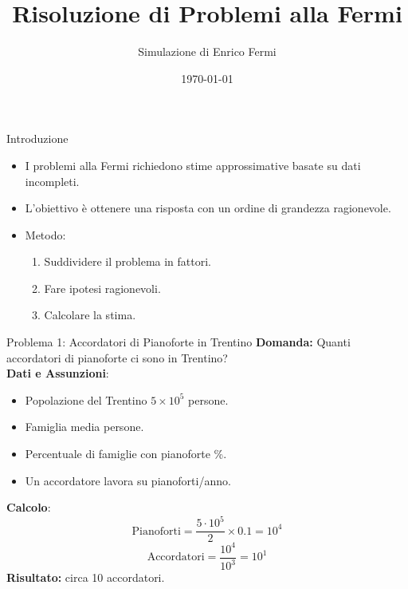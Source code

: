 \documentclass{beamer}
\title{Risoluzione di Problemi alla Fermi}
\author{Simulazione di Enrico Fermi}
\date{\today}
\begin{document}
\begin{frame}
    \titlepage
\end{frame}

\begin{frame}{Introduzione}
    \begin{itemize}
        \item I problemi alla Fermi richiedono stime approssimative basate su dati incompleti. \pause
        \item L'obiettivo è ottenere una risposta con un ordine di grandezza ragionevole. \pause
        \item Metodo: \pause
        \begin{enumerate}
            \item Suddividere il problema in fattori. \pause
            \item Fare ipotesi ragionevoli. \pause
            \item Calcolare la stima.
        \end{enumerate}
    \end{itemize}
\end{frame}

\begin{frame}{Problema 1: Accordatori di Pianoforte in Trentino}
    \textbf{Domanda:} Quanti accordatori di pianoforte ci sono in Trentino? \\
    \vspace{1em}
    \textbf{Dati e Assunzioni}: \pause
    \begin{itemize}
        \item Popolazione del Trentino \pause
        $5 \times 10^5$ persone. \pause
        \item Famiglia media   persone. \pause
        \item Percentuale di famiglie con pianoforte  \%. \pause
        \item Un accordatore lavora su  pianoforti/anno. \pause
    \end{itemize}
    \pause
    \textbf{Calcolo}:
    \[
    \text{Pianoforti} = \frac{5 \cdot 10^5}{2} \times 0.1 = 10^4
    \]
    \pause
    \[
    \text{Accordatori} = \frac{10^4}{10^3} = 10^1
    \]
    \pause
    \textbf{Risultato:} circa 10 accordatori.
\end{frame}
\end{document}
